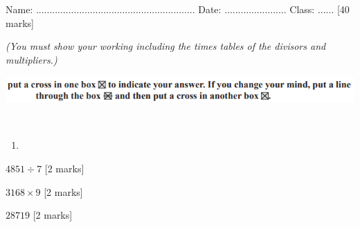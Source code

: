 \documentclass{article}
\date{}
\begin{document}
\fontsize{13}{15} \selectfont %

\begin{center}
  \qquad \\ 
\end{center} \\ 

Name: ...........................................................  \hspace{0.5cm}  Date: ....................... \hspace{0.5cm}  Class: ......\hspace{0.5cm} [40 marks]

\par
\vspace*{5pt} 
\textit{(You must show your working including the times tables of the divisors and multipliers.)  }

\begin{center}
    \includegraphics[width=15cm]{Year_6_Mixed_Tests/Xx.png}
\end{center}
 \\

 \begin{enumerate}
     \item 
 \end{enumerate}

\quad \( 4851 \div 7 \)   \hspace{2cm} [2 marks] 
\vspace{90pt}
\hline
\vspace{5pt}

\quad \( 3168 \times 9 \) \hspace{2cm} [2 marks]
\vspace{90pt}
\hline
\vspace{5pt}

\quad {}  \( 28719\)  \hspace{2cm} [2 marks]
\vspace{40pt}
\end{document}
